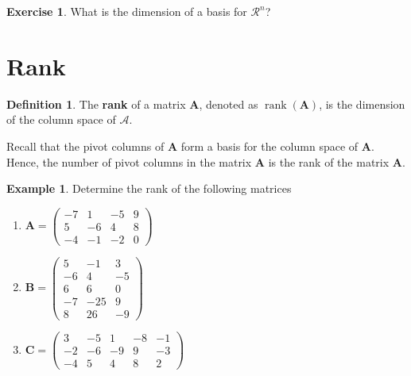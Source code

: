 \documentclass[
]{book}
\theoremstyle{definition}
\newtheorem{definition}{Definition}[chapter]
\theoremstyle{definition}
\newtheorem{example}{Example}[chapter]
\theoremstyle{definition}
\newtheorem{exercise}{Exercise}[chapter]
\theoremstyle{definition}
\theoremstyle{remark}
\begin{document}
\begin{exercise}
What is the dimension of a basis for \(\mathcal{R}^n\)?
\end{exercise}

\hypertarget{rank}{%
\section{Rank}\label{rank}}

\begin{definition}
\protect\hypertarget{def:rank}{}\label{def:rank}The \textbf{rank} of a matrix \(\mathbf{A}\), denoted as \(\operatorname{rank}(\mathbf{A})\), is the dimension of the column space of \(\mathcal{A}\).
\end{definition}

Recall that the pivot columns of \(\mathbf{A}\) form a basis for the column space of \(\mathbf{A}\). Hence, the number of pivot columns in the matrix \(\mathbf{A}\) is the rank of the matrix \(\mathbf{A}\).

\begin{example}

Determine the rank of the following matrices

\begin{enumerate}
\def\labelenumi{\arabic{enumi})}
\item
  \(\mathbf{A} = \begin{pmatrix} -7 & 1 & -5 & 9 \\ 5 & -6 & 4 & 8 \\ -4 & -1 & -2 & 0 \end{pmatrix}\)
\item
  \(\mathbf{B} = \begin{pmatrix} 5 & -1 & 3 \\ -6 & 4 & -5 \\ 6 & 6 & 0 \\ -7 & -25 & 9 \\ 8 & 26 & -9 \end{pmatrix}\)
\item
  \(\mathbf{C} = \begin{pmatrix} 3 & -5 & 1 & -8 & -1 \\ -2 & -6 & -9 & 9 & -3 \\ -4 & 5 & 4 & 8 & 2 \end{pmatrix}\)
\end{enumerate}

\end{example}
\end{document}
